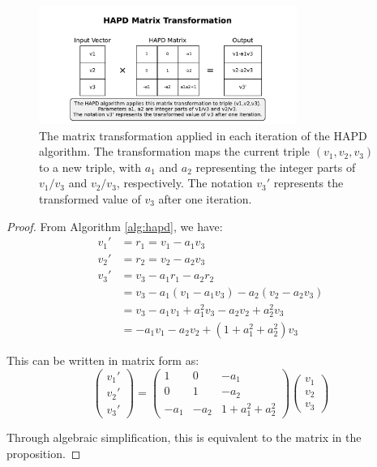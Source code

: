 \begin{figure}[p]
\vspace*{2cm}
\begin{minipage}{\textwidth}
\centering
\includegraphics[width=0.75\textwidth]{figures/output/matrix_transformation.pdf}

\vspace{1.5cm}
\caption{The matrix transformation applied in each iteration of the HAPD algorithm. The transformation maps the current triple $(v_1, v_2, v_3)$ to a new triple, with $a_1$ and $a_2$ representing the integer parts of $v_1/v_3$ and $v_2/v_3$, respectively. The notation $v_3'$ represents the transformed value of $v_3$ after one iteration.}
\label{fig:matrix_transformation}
\end{minipage}
\vspace{2cm}
\end{figure}

\begin{proof}
From Algorithm \ref{alg:hapd}, we have:
\begin{align*}
v_1' &= r_1 = v_1 - a_1v_3 \\
v_2' &= r_2 = v_2 - a_2v_3 \\
v_3' &= v_3 - a_1r_1 - a_2r_2 \\
&= v_3 - a_1(v_1 - a_1v_3) - a_2(v_2 - a_2v_3) \\
&= v_3 - a_1v_1 + a_1^2v_3 - a_2v_2 + a_2^2v_3 \\
&= -a_1v_1 - a_2v_2 + (1 + a_1^2 + a_2^2)v_3
\end{align*}

This can be written in matrix form as:
\begin{equation}
\begin{pmatrix} v_1' \\ v_2' \\ v_3' \end{pmatrix} = 
\begin{pmatrix} 
1 & 0 & -a_1 \\
0 & 1 & -a_2 \\
-a_1 & -a_2 & 1 + a_1^2 + a_2^2
\end{pmatrix}
\begin{pmatrix} v_1 \\ v_2 \\ v_3 \end{pmatrix}
\end{equation}

Through algebraic simplification, this is equivalent to the matrix in the proposition.
\end{proof}

